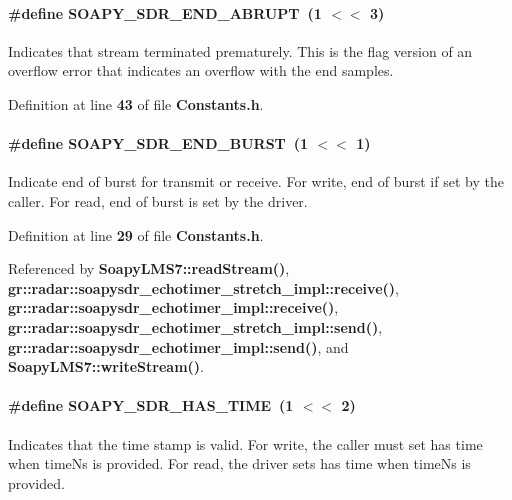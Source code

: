 \paragraph[{S\+O\+A\+P\+Y\+\_\+\+S\+D\+R\+\_\+\+E\+N\+D\+\_\+\+A\+B\+R\+U\+PT}]{\setlength{\rightskip}{0pt plus 5cm}\#define S\+O\+A\+P\+Y\+\_\+\+S\+D\+R\+\_\+\+E\+N\+D\+\_\+\+A\+B\+R\+U\+PT~(1 $<$$<$ 3)}\label{Constants_8h_a88694bc684d19d508eb9d87ee81a729a}
Indicates that stream terminated prematurely. This is the flag version of an overflow error that indicates an overflow with the end samples. 

Definition at line {\bf 43} of file {\bf Constants.\+h}.

\paragraph[{S\+O\+A\+P\+Y\+\_\+\+S\+D\+R\+\_\+\+E\+N\+D\+\_\+\+B\+U\+R\+ST}]{\setlength{\rightskip}{0pt plus 5cm}\#define S\+O\+A\+P\+Y\+\_\+\+S\+D\+R\+\_\+\+E\+N\+D\+\_\+\+B\+U\+R\+ST~(1 $<$$<$ 1)}\label{Constants_8h_addd74e69bb857a7df671b6985e5d544d}
Indicate end of burst for transmit or receive. For write, end of burst if set by the caller. For read, end of burst is set by the driver. 

Definition at line {\bf 29} of file {\bf Constants.\+h}.



Referenced by {\bf Soapy\+L\+M\+S7\+::read\+Stream()}, {\bf gr\+::radar\+::soapysdr\+\_\+echotimer\+\_\+stretch\+\_\+impl\+::receive()}, {\bf gr\+::radar\+::soapysdr\+\_\+echotimer\+\_\+impl\+::receive()}, {\bf gr\+::radar\+::soapysdr\+\_\+echotimer\+\_\+stretch\+\_\+impl\+::send()}, {\bf gr\+::radar\+::soapysdr\+\_\+echotimer\+\_\+impl\+::send()}, and {\bf Soapy\+L\+M\+S7\+::write\+Stream()}.

\paragraph[{S\+O\+A\+P\+Y\+\_\+\+S\+D\+R\+\_\+\+H\+A\+S\+\_\+\+T\+I\+ME}]{\setlength{\rightskip}{0pt plus 5cm}\#define S\+O\+A\+P\+Y\+\_\+\+S\+D\+R\+\_\+\+H\+A\+S\+\_\+\+T\+I\+ME~(1 $<$$<$ 2)}\label{Constants_8h_a67027b65f63dffe851594c2df4a9d034}
Indicates that the time stamp is valid. For write, the caller must set has time when time\+Ns is provided. For read, the driver sets has time when time\+Ns is provided. 


